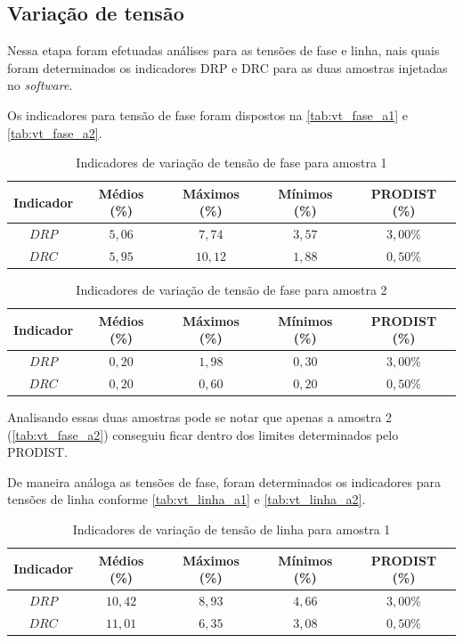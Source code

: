 \subsection{Variação de tensão}

Nessa etapa foram efetuadas análises para as tensões de fase e linha, nais quais foram determinados os indicadores DRP e DRC para as duas amostras injetadas no \textit{software}.

Os indicadores para tensão de fase foram dispostos na \autoref{tab:vt_fase_a1} e \autoref{tab:vt_fase_a2}.

\begin{table}[H]
  \centering
  \caption{Indicadores de variação de tensão de fase para amostra 1}
  \label{tab:vt_fase_a1}
  \begin{tabular}{@{}ccccc@{}}
    \toprule
    Indicador & Médios (\%) & Máximos (\%) & Mínimos (\%) & PRODIST (\%) \\
    \midrule
    $DRP$ & $5,06$ & $7,74$ & $3,57$ & $3,00\%$ \\
    $DRC$ & $5,95$ & $10,12$ & $1,88$ & $0,50\%$ \\
    \bottomrule
  \end{tabular}
\end{table}

\begin{table}[H]
  \centering
  \caption{Indicadores de variação de tensão de fase para amostra 2}
  \label{tab:vt_fase_a2}
  \begin{tabular}{@{}ccccc@{}}
    \toprule
    Indicador & Médios (\%) & Máximos (\%) & Mínimos (\%) & PRODIST (\%) \\
    \midrule
    $DRP$ & $0,20$ & $1,98$ & $0,30$ & $3,00\%$ \\
    $DRC$ & $0,20$ & $0,60$ & $0,20$ & $0,50\%$ \\
    \bottomrule
  \end{tabular}
\end{table}

Analisando essas duas amostras pode se notar que apenas a amostra 2 (\autoref{tab:vt_fase_a2}) conseguiu ficar dentro dos limites determinados pelo PRODIST. 

De maneira análoga as tensões de fase, foram determinados os indicadores para tensões de linha conforme \autoref{tab:vt_linha_a1} e \ref{tab:vt_linha_a2}.

\begin{table}[H]
  \centering
  \caption{Indicadores de variação de tensão de linha para amostra 1}
  \label{tab:vt_linha_a1}
  \begin{tabular}{@{}ccccc@{}}
    \toprule
    Indicador & Médios (\%) & Máximos (\%) & Mínimos (\%) & PRODIST (\%) \\
    \midrule
    $DRP$ & $10,42$ & $8,93$ & $4,66$ & $3,00\%$ \\
    $DRC$ & $11,01$ & $6,35$ & $3,08$ & $0,50\%$ \\
    \bottomrule
  \end{tabular}
\end{table}

